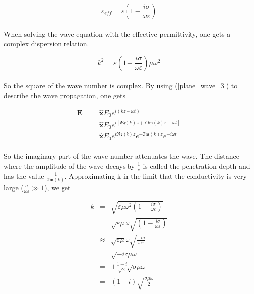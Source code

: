 \documentclass[a4paper,10pt]{thesis}
\begin{document}
\begin{equation}\label{complex_permittivity}
    \varepsilon_{eff}=\varepsilon\left( 1- \frac{ i\sigma}{ \omega \varepsilon}\right)
\end{equation}

\paragraph*{}
When solving the wave equation with the effective permittivity, one gets a complex dispersion relation.

\begin{equation}\label{dispersionrelarion_complex}
    k^2 = \varepsilon\left( 1- \frac{ i\sigma}{ \omega \varepsilon}\right) \mu  \omega^2
\end{equation}

\paragraph*{}
So the square of the wave number is complex. By using (\ref{plane_wave_3}) to describe the wave propagation, one gets

\begin{eqnarray}\label{plane_wave_conductor}
    \mathbf{E}&=& \mathbf{\hat{x}}E_0 e^{i(kz-\omega t)} \nonumber\\
&=& \mathbf{\hat{x}}E_0 e^{i\left[ \mathfrak{Re}(k)z+i\mathfrak{Im}(k)z-\omega t\right] } \nonumber \\
&=& \mathbf{\hat{x}}E_0 e^{i\mathfrak{Re}(k)z}e^{-\mathfrak{Im}(k)z}e^{-i\omega t}
\end{eqnarray}

\paragraph*{}
So the imaginary part of the wave number attenuates the wave. The distance where the amplitude of the wave decays by $\frac{1}{e}$ is called the penetration depth and has the value $\frac{1}{\mathfrak{Im}(k)}$. Approximating k in the limit that the conductivity is very large ($\frac{ \sigma}{ \omega \varepsilon} \gg 1$), we get

\begin{eqnarray}
  k &=& \sqrt{\varepsilon \mu  \omega^2 \left( 1- \frac{ i\sigma}{ \omega \varepsilon}\right) } \nonumber\\
&=& \sqrt{\varepsilon \mu}  \omega \sqrt{\left( 1- \frac{ i\sigma}{ \omega \varepsilon}\right) } \nonumber \\
&\approx& \sqrt{\varepsilon \mu}  \omega \sqrt{ \frac{ -i\sigma}{ \omega \varepsilon} } \nonumber \\
&=&  \sqrt{  -i\sigma \mu \omega } \nonumber \\
&=& \pm \frac{1-i}{\sqrt{2}} \sqrt{ \sigma \mu \omega } \nonumber \\
&=& (1-i) \sqrt{\frac{ \sigma \mu \omega }{2}}
\end{eqnarray}
\end{document}
